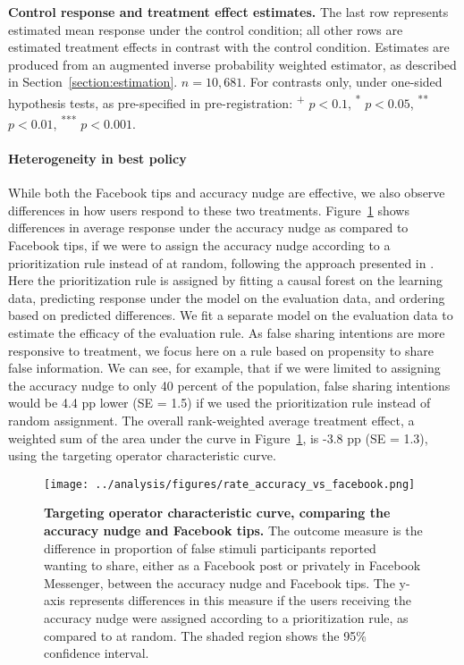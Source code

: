 \documentclass[letterpaper, 12pt, parskip=full,DIV=10]{scrartcl}
\begin{document}
\begin{table}[H]
{}
\caption{\textbf{Control response and treatment effect estimates.} The last row represents estimated mean response under the control condition; all other rows are estimated treatment effects in contrast with the control condition. Estimates are produced from an augmented inverse probability weighted estimator, as described in Section~\ref{section:estimation}. $n = 10,681$. For contrasts only, under one-sided hypothesis tests, as pre-specified in pre-registration: \textsuperscript{+} $p<0.1$, \textsuperscript{*} $p < 0.05$, \textsuperscript{**} $p < 0.01$, \textsuperscript{***} $p < 0.001$.} 
\label{tab:main_results}
\end{table}



\paragraph{Heterogeneity in best policy}\label{section:het_policy}
While both the Facebook tips and accuracy nudge are effective, we also observe differences in how users respond to these two treatments. Figure~\ref{fig:RATE} shows differences in average response under the accuracy nudge as compared to Facebook tips, if we were to assign the accuracy nudge according to a prioritization rule instead of at random, following the approach presented in \citet{yadlowsky2021evaluating}. Here the prioritization rule is assigned by fitting a causal forest on the learning data, predicting response under the model on the evaluation data, and ordering based on predicted differences. We fit a separate model on the evaluation data to estimate the efficacy of the evaluation rule. As false sharing intentions are more responsive to treatment, we focus here on a rule based on propensity to share false information. We can see, for example, that if we were limited to assigning the accuracy nudge to only 40 percent of the population, false sharing intentions would be 4.4 pp lower (SE = 1.5) if we used the prioritization rule instead of random assignment. The overall rank-weighted average treatment effect, a weighted sum of the area under the curve in Figure~\ref{fig:RATE}, is -3.8 pp (SE = 1.3), using the targeting operator characteristic curve. 

\begin{figure}[H] %
   \centering
   \texttt{[image: ../analysis/figures/rate\_accuracy\_vs\_facebook.png]} 
   \caption{\textbf{Targeting operator characteristic curve, comparing the accuracy nudge and Facebook tips.} The outcome measure is the difference in proportion of false stimuli participants reported wanting to share, either as a Facebook post or privately in Facebook Messenger, between the accuracy nudge and Facebook tips. The y-axis represents differences in this measure if the users receiving the accuracy nudge were assigned according to a prioritization rule, as compared to at random. The shaded region shows the 95\% confidence interval.}
   \label{fig:RATE}
\end{figure}
\end{document}
